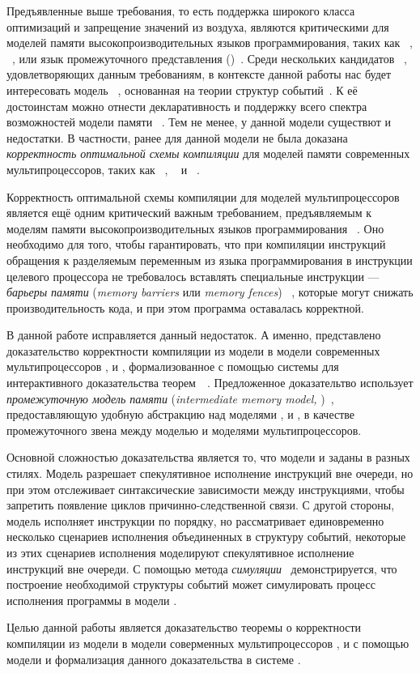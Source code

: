 Предъявленные выше требования, 
то есть поддержка широкого класса оптимизаций и 
запрещение значений из воздуха, являются 
критическими для моделей памяти высокопроизводительных 
языков программирования, таких как \CPP~\cite{Batty-al:POPL11}, 
\Java~\cite{Manson-al:POPL05}, или язык промежуточного представления \LLVM 
(\LLVMIR)~\cite{Chakraborty-Vafeiadis:CGO17}.
Среди нескольких кандидатов~%
\cite{Kang-al:POPL17,Paviotti-al:ESOP20,Jagadeesan-al:OOPSLA2020}, 
удовлетворяющих данным требованиям, в контексте данной работы нас будет 
интересовать модель \Wkm~\cite{Chakraborty-Vafeiadis:POPL19}, 
основанная на теории структур событий~\cite{Winskel:86}. 
К её достоинстам можно отнести декларативность и поддержку 
всего спектра возможностей модели памяти \CPP~\cite{Batty-al:POPL11}. 
Тем не менее, у данной модели существют и недостатки. 
В частности, ранее для данной модели не была доказана 
\emph{корректность оптимальной схемы компиляции} для моделей памяти 
современных мультипроцессоров, таких как 
\Intel~\cite{Sewell-al:CACM10}, \ARM~\cite{Pulte-al:POPL18} 
и \POWER~\cite{Alglave-al:TOPLAS14}. 
 
Корректность оптимальной схемы компиляции для моделей мультипроцессоров 
является ещё одним критический важным требованием, 
предъявляемым к моделям памяти высокопроизводительных языков программирования%
~\cite{Moiseenko-al:PCS21}.
Оно необходимо для того, чтобы гарантировать, 
что при компиляции инструкций обращения к разделяемым переменным 
из языка программирования в инструкции целевого процессора
не требовалось вставлять специальные инструкции --- 
\emph{барьеры памяти} (\emph{memory barriers} или \emph{memory fences})%
~\cite{McKenney:2010}, которые могут снижать производительность кода,
и при этом программа оставалась корректной. 

В данной работе исправляется данный недостаток. 
А именно, представлено доказательство корректности компиляции
из модели \Wkm в модели современных мультипроцессоров \Intel, \ARM и \POWER, 
формализованное с помощью системы для интерактивного 
доказательства теорем~\coq~\cite{Coq}.
Предложенное доказательтво использует \emph{промежуточную модель памяти}
(\emph{intermediate memory model, \IMM})~\cite{Podkopaev-al:POPL19}, 
предоставляющую удобную абстракцию над моделями \Intel, \ARM и \POWER, 
в качестве промежуточного звена между моделью \Wkm и моделями мультипроцессоров.

Основной сложностью доказательства является то, что модели \Wkm и \IMM
заданы в разных стилях. Модель \IMM разрешает спекулятивное 
исполнение инструкций вне очереди, но при этом 
отслеживает синтаксические зависимости между инструкциями, 
чтобы запретить появление циклов причинно-следственной связи. 
С другой стороны, модель \Wkm исполняет инструкции по порядку, 
но рассматривает единовременно несколько сценариев исполнения
объединенных в структуру событий,
некоторые из этих сценариев исполнения моделируют 
спекулятивное исполнение инструкций вне очереди. 
С помощью метода \emph{симуляции}~\cite{Milner:1971} 
демонстрируется, что построение необходимой структуры событий может 
симулировать процесс исполнения программы в модели \IMM.

\pagebreak


Целью данной работы является доказательство 
теоремы о корректности компиляции из модели \Wkm 
в модели соверменных мультипроцессоров \Intel, \ARM и \POWER
с помощью модели \IMM и формализация данного доказательства в системе \coq. 
